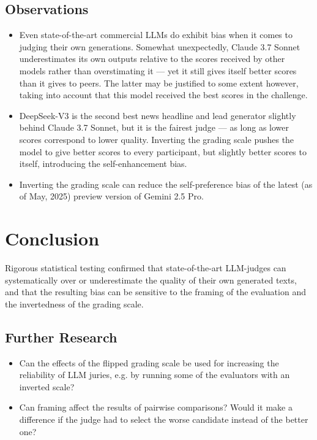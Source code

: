\documentclass[noindent,nohyp,parspace,titlepage,twoside,12pt]{article}
\begin{document}
    \subsection{Observations}

      \begin{itemize}
        \item Even state-of-the-art commercial LLMs do exhibit bias when it
              comes to judging their own generations. Somewhat unexpectedly,
              Claude 3.7 Sonnet underestimates its own outputs relative to the
              scores received by other models rather than overstimating it ---
              yet it still gives itself better scores than it gives to peers.
              The latter may be justified to some extent however, taking into
              account that this model received the best scores in the
              challenge.

        \item DeepSeek-V3 is the second best news headline and lead generator
              slightly behind Claude 3.7 Sonnet, but it is the fairest judge
              --- as long as lower scores correspond to lower quality. Inverting
              the grading scale pushes the model to give better scores to every
              participant, but slightly better scores to itself, introducing the
              self-enhancement bias.

        \item Inverting the grading scale can reduce the self-preference bias of
              the latest (as of May, 2025) preview version of Gemini 2.5 Pro.
      \end{itemize}

  \section{Conclusion}

    Rigorous statistical testing confirmed that state-of-the-art LLM-judges can
    systematically over or underestimate the quality of their own generated
    texts, and that the resulting bias can be sensitive to the framing of the
    evaluation and the invertedness of the grading scale.

    \subsection{Further Research}

      \begin{itemize}
        \item Can the effects of the flipped grading scale be used for
              increasing the reliability of LLM juries, e.g. by running some of
              the evaluators with an inverted scale?

        \item Can framing affect the results of pairwise comparisons? Would it
              make a difference if the judge had to select the worse candidate
              instead of the better one?
      \end{itemize}
\end{document}
